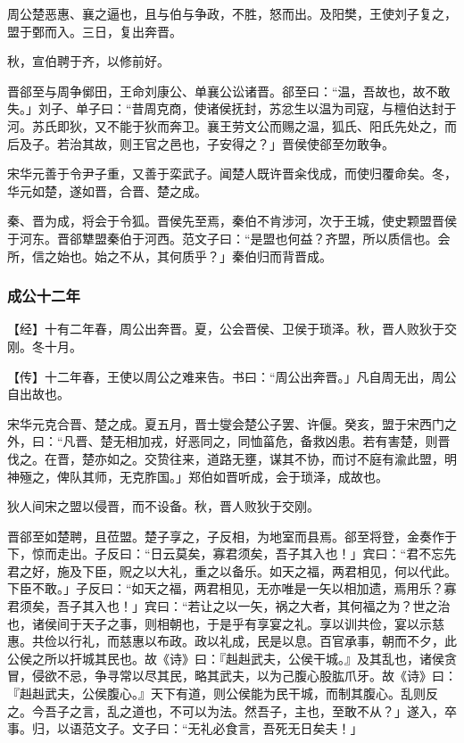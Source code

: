 \documentclass[]{article}
\begin{document}
周公楚恶惠、襄之逼也，且与伯与争政，不胜，怒而出。及阳樊，王使刘子复之，盟于鄄而入。三日，复出奔晋。

秋，宣伯聘于齐，以修前好。

晋郤至与周争鄇田，王命刘康公、单襄公讼诸晋。郤至曰：``温，吾故也，故不敢失。」刘子、单子曰：``昔周克商，使诸侯抚封，苏忿生以温为司寇，与檀伯达封于河。苏氏即狄，又不能于狄而奔卫。襄王劳文公而赐之温，狐氏、阳氏先处之，而后及子。若治其故，则王官之邑也，子安得之？」晋侯使郤至勿敢争。

宋华元善于令尹子重，又善于栾武子。闻楚人既许晋籴伐成，而使归覆命矣。冬，华元如楚，遂如晋，合晋、楚之成。

秦、晋为成，将会于令狐。晋侯先至焉，秦伯不肯涉河，次于王城，使史颗盟晋侯于河东。晋郤犨盟秦伯于河西。范文子曰：``是盟也何益？齐盟，所以质信也。会所，信之始也。始之不从，其何质乎？」秦伯归而背晋成。

\hypertarget{header-n1683}{%
\subsubsection{成公十二年}\label{header-n1683}}

【经】十有二年春，周公出奔晋。夏，公会晋侯、卫侯于琐泽。秋，晋人败狄于交刚。冬十月。

【传】十二年春，王使以周公之难来告。书曰：``周公出奔晋。」凡自周无出，周公自出故也。

宋华元克合晋、楚之成。夏五月，晋士燮会楚公子罢、许偃。癸亥，盟于宋西门之外，曰：``凡晋、楚无相加戎，好恶同之，同恤菑危，备救凶患。若有害楚，则晋伐之。在晋，楚亦如之。交贽往来，道路无壅，谋其不协，而讨不庭有渝此盟，明神殛之，俾队其师，无克胙国。」郑伯如晋听成，会于琐泽，成故也。

狄人间宋之盟以侵晋，而不设备。秋，晋人败狄于交刚。

晋郤至如楚聘，且莅盟。楚子享之，子反相，为地室而县焉。郤至将登，金奏作于下，惊而走出。子反曰：``日云莫矣，寡君须矣，吾子其入也！」宾曰：``君不忘先君之好，施及下臣，贶之以大礼，重之以备乐。如天之福，两君相见，何以代此。下臣不敢。」子反曰：``如天之福，两君相见，无亦唯是一矢以相加遗，焉用乐？寡君须矣，吾子其入也！」宾曰：``若让之以一矢，祸之大者，其何福之为？世之治也，诸侯间于天子之事，则相朝也，于是乎有享宴之礼。享以训共俭，宴以示慈惠。共俭以行礼，而慈惠以布政。政以礼成，民是以息。百官承事，朝而不夕，此公侯之所以扞城其民也。故《诗》曰：『赳赳武夫，公侯干城。』及其乱也，诸侯贪冒，侵欲不忌，争寻常以尽其民，略其武夫，以为己腹心股肱爪牙。故《诗》曰：『赳赳武夫，公侯腹心。』天下有道，则公侯能为民干城，而制其腹心。乱则反之。今吾子之言，乱之道也，不可以为法。然吾子，主也，至敢不从？」遂入，卒事。归，以语范文子。文子曰：``无礼必食言，吾死无日矣夫！」
\end{document}
